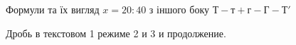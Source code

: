 \documentclass{kapital}
\begin{document}
   Формули та їх вигляд $x = 20 : 40 $ з іншого боку $Т - т + г - Г - Т'$

   Дробь в текстовом 1 режиме 2 и 3 и продолжение.
\end{document}
